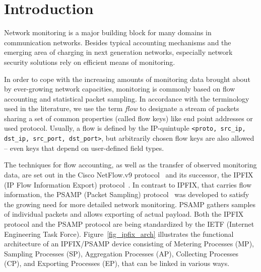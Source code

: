 \section{Introduction}
Network monitoring is a major building block for many domains in communication networks.
Besides typical accounting mechanisms and the emerging area of charging in next generation networks, especially network security solutions rely on efficient means of monitoring.

In order to cope with the increasing amounts of monitoring data brought about by ever-growing network capacities, monitoring is commonly based on flow accounting and statistical packet sampling. 
In accordance with the terminology used in the literature, we use the term \emph{flow} to designate a stream of packets sharing a set of common properties (called flow keys) like end point addresses or used protocol.
Usually, a flow is defined by the IP-quintuple \texttt{<proto, src\_ip, dst\_ip, src\_port, dst\_port>}, but arbitrarily chosen flow keys are also allowed -- even keys that depend on user-defined field types.

The techniques for flow accounting, as well as the transfer of observed monitoring data, are set out in the Cisco NetFlow.v9 protocol~\cite{rfc3954} and its successor, the IPFIX (IP Flow Information Export) protocol~\cite{ietf-ipfix-protocol}.
In contrast to IPFIX, that carries flow information, the PSAMP (Packet Sampling) protocol~\cite{ietf-psamp-protocol} was developed to satisfy the growing need for more detailed network monitoring.
PSAMP gathers samples of individual packets and allows exporting of actual payload.
Both the IPFIX protocol and the PSAMP protocol are being standardized by the IETF (Internet Engineering Task Force).
Figure~\ref{fig_ipfix_arch} illustrates the functional architecture of an IPFIX/PSAMP device consisting of Metering Processes (MP), Sampling Processes (SP), Aggregation Processes (AP), Collecting Processes (CP), and Exporting Processes (EP), that can be linked in various ways.

